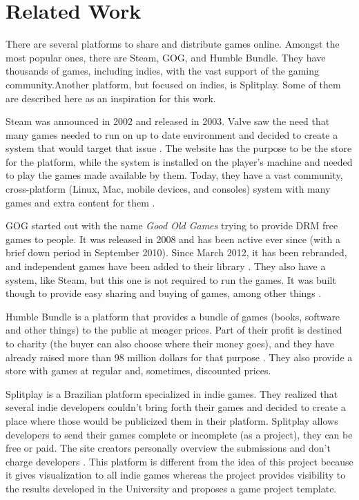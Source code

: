 \section{Related Work}
\label {sec:related_work}

There are several platforms to share and distribute games online. Amongst the most popular ones, there are Steam, GOG, and Humble Bundle. They have thousands of games, including indies, with the vast support of the gaming community.Another platform, but focused on indies, is Splitplay. Some of them are described here as an inspiration for this work.

Steam was announced in 2002 and released in 2003. Valve saw the need that many games needed to run on up to date environment and decided to create a system that would target that issue \cite{wikipedia2017steam}. The website has the purpose to be the store for the platform, while the system is installed on the player's machine and needed to play the games made available by them. Today, they have a vast community, cross-platform (Linux, Mac, mobile devices, and consoles) system with many games and extra content for them \cite{steam2017}.

GOG started out with the name \textit{Good Old Games} trying to provide DRM free games to people. It was released in 2008 and has been active ever since (with a brief down period in September 2010). Since March 2012, it has been rebranded, and independent games have been added to their library \cite{wikipedia2017gog}. They also have a system, like Steam, but this one is not required to run the games. It was built though to provide easy sharing and buying of games, among other things \cite{gog2017}.

Humble Bundle is a platform that provides a bundle of games (books, software and other things) to the public at meager prices. Part of their profit is destined to charity (the buyer can also choose where their money goes), and they have already raised more than 98 million dollars for that purpose \cite{humblebundle2017}. They also provide a store with games at regular and, sometimes, discounted prices.

Splitplay is a Brazilian platform specialized in indie games. They realized that several indie developers couldn't bring forth their games and decided to create a place where those would be publicized them in their platform. Splitplay allows developers to send their games complete or incomplete (as a project), they can be free or paid. The site creators personally overview the submissions and don't charge developers \cite{splitplay2017}. This platform is different from the idea of this project because it gives visualization to all indie games whereas the project provides visibility to the results developed in the University and proposes a game project template.
